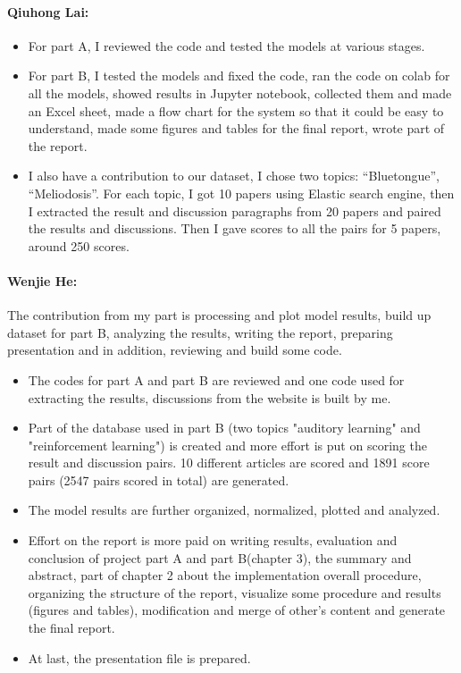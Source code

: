 \paragraph{Qiuhong Lai:}
\begin{itemize}
	\item For part A, I reviewed the code and tested the models at various stages.
	\item For part B, I tested the models and fixed the code, ran the code on colab for all the models, showed results in Jupyter notebook, collected them and made an Excel sheet, made a flow chart for the system so that it could be easy to understand, made some figures and tables for the final report, wrote part of the report. 
	\item I also have a contribution to our dataset, I chose two topics: “Bluetongue”, “Meliodosis”. 
	For each topic, I got 10 papers using Elastic search engine, then I extracted the result and discussion paragraphs from 20 papers and paired the results and discussions. Then I gave scores to all the pairs for 5 papers, around 250 scores.
\end{itemize}	

\paragraph{Wenjie He:}
The contribution from my part is processing and plot model results, build up dataset for part B, analyzing the results, writing the report, preparing presentation and in addition, reviewing and build some code.
\begin{itemize}
	\item The codes for part A and part B are reviewed and one code used for extracting the results, discussions from the website is built by me.		
	\item Part of the database used in part B (two topics "auditory learning" and "reinforcement learning") is created and more effort is put on scoring the result and discussion pairs. 10 different articles are scored and 1891 score pairs (2547 pairs scored in total) are generated.
	\item The model results are further organized, normalized, plotted and analyzed.
	\item Effort on the report is more paid on writing results, evaluation and conclusion of project part A and part B(chapter 3), the summary and abstract, part of chapter 2 about the implementation overall procedure, organizing the structure of the report, visualize some procedure and results (figures and tables), modification and merge of other's content and generate the final report.
	\item At last, the presentation file is prepared.
\end{itemize}

